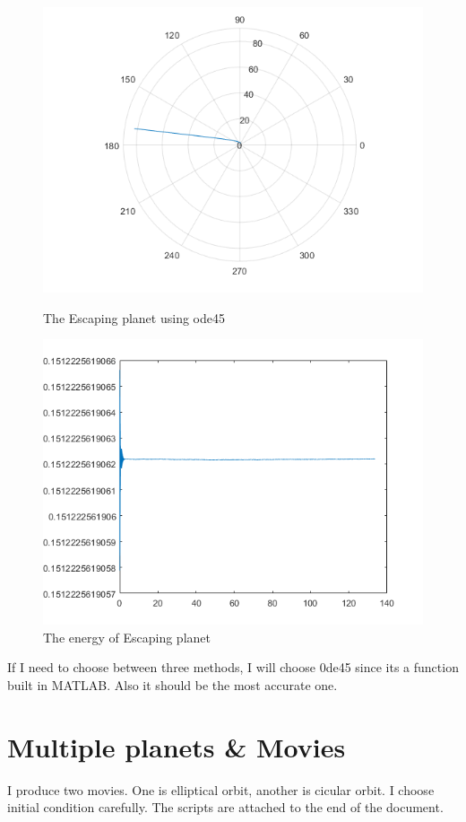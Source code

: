 \documentclass{article}
\begin{document}
\begin{figure}[htbp]
    \centering
    \begin{minipage}{0.45\linewidth}
        \centering
        \includegraphics[width=0.8\linewidth]{br4.png}
        \caption{The Escaping planet using ode45}
    \end{minipage}
    \hfill
    \begin{minipage}{0.45\linewidth}
        \centering
        \includegraphics[width=0.8\linewidth]{br41.png}
        \caption{The energy of Escaping planet}
    \end{minipage}
\end{figure}

If I need to choose between three methods, I will choose 0de45 since its a function built in MATLAB. Also it should be the most accurate one.


\section{Multiple planets \& Movies}
I produce two movies. One is elliptical orbit, another is cicular orbit. I choose initial condition carefully. The scripts are attached to the end of the document.
\end{document}
